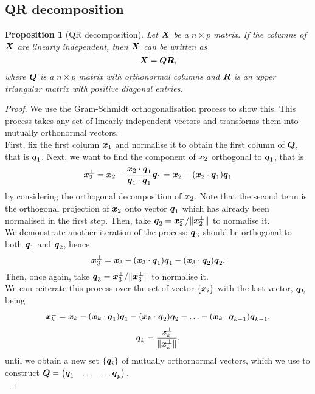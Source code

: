 \documentclass[12pt]{article}
\newtheorem{prop}{Proposition}[section]
\begin{document}
	\subsection{QR decomposition\label{sec:qr}}
	\begin{prop}[QR decomposition\label{prop:qr}]
		Let $\boldsymbol{X}$ be a $n\times p$ matrix. If the columns of $\boldsymbol{X}$ are linearly independent, then $\boldsymbol{X}$ can be written as
		$$\boldsymbol{X}=\boldsymbol{Q}\boldsymbol{R},$$
		where $\boldsymbol{Q}$ is a $n\times p$ matrix with orthonormal columns and $\boldsymbol{R}$ is an upper triangular matrix with positive diagonal entries.
	\end{prop}
	\begin{proof}
		We use the Gram-Schmidt orthogonalisation process \cite{Hefferson2020} to show this. This process takes any set of linearly independent vectors and transforms them into mutually orthonormal vectors.\\
		
		First, fix the first column $\boldsymbol{x}_1$ and normalise it to obtain the first column of $\boldsymbol{Q}$, that is $\boldsymbol{q}_1$. Next, we want to find the component of $\boldsymbol{x}_2$ orthogonal to $\boldsymbol{q}_1$, that is
		\begin{equation}
			\boldsymbol{x}_2^{\perp}=\boldsymbol{x}_2-\frac{\boldsymbol{x}_2\cdot\boldsymbol{q}_1}{\boldsymbol{q}_1\cdot\boldsymbol{q}_1}\boldsymbol{q}_1=\boldsymbol{x}_2-(\boldsymbol{x}_2\cdot\boldsymbol{q}_1)\boldsymbol{q}_1
		\end{equation}
		by considering the orthogonal decomposition of $\boldsymbol{x}_2$. Note that the second term is the orthogonal projection of $\boldsymbol{x}_2$ onto vector $\boldsymbol{q}_1$ which has already been normalised in the first step. Then, take $\boldsymbol{q}_2=\boldsymbol{x}_2^{\perp}/\|\boldsymbol{x}_2^{\perp}\|$ to normalise it.\\
		
		We demonstrate another iteration of the process: $\boldsymbol{q}_3$ should be orthogonal to both $\boldsymbol{q}_1$ and $\boldsymbol{q}_2$, hence
		\begin{equation}
			\boldsymbol{x}^{\perp}_3=\boldsymbol{x}_3-
			(\boldsymbol{x}_3\cdot\boldsymbol{q}_1)\boldsymbol{q}_1-
			(\boldsymbol{x}_3\cdot\boldsymbol{q}_2)\boldsymbol{q}_2.
		\end{equation}
		Then, once again, take $\boldsymbol{q}_3=\boldsymbol{x}_3^{\perp}/\|\boldsymbol{x}_3^{\perp}\|$ to normalise it.\\
		
		We can reiterate this process over the set of vector $\{\boldsymbol{x}_i\}$ with the last vector, $\boldsymbol{q}_k$ being
		\begin{equation}
			\boldsymbol{x}^{\perp}_k=\boldsymbol{x}_k-(\boldsymbol{x}_k\cdot\boldsymbol{q}_1)\boldsymbol{q}_1-
			(\boldsymbol{x}_k\cdot\boldsymbol{q}_2)\boldsymbol{q}_2-\ldots-(\boldsymbol{x}_k\cdot\boldsymbol{q}_{k-1})\boldsymbol{q}_{k-1},
		\end{equation}
		\begin{equation}
			\boldsymbol{q}_k=\frac{\boldsymbol{x}_k^{\perp}}{\|\boldsymbol{x}_k^{\perp}\|},
		\end{equation}
		 until we obtain a new set $\{\boldsymbol{q}_i\}$ of mutually orthornormal vectors, which we use to construct $\boldsymbol{Q}=\begin{pmatrix}
		\boldsymbol{q}_1 & \ldots & \ldots \boldsymbol{q}_p
		\end{pmatrix}.$ \\
		

\end{proof}
\end{document}
